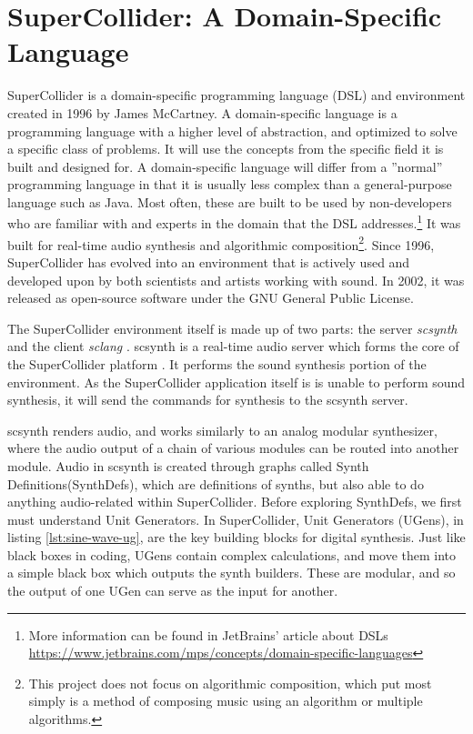 \section[SuperCollider: A Domain-Specific Language]{SuperCollider: A Domain-Specific Language}\label{chapter:supercollider}

SuperCollider is a domain-specific programming language (DSL) and environment created in 1996 by James McCartney. A domain-specific language is a programming language with a higher level of abstraction, and optimized to solve a specific class of problems. It will use the concepts from the specific field it is built and designed for. A domain-specific language will differ from a ''normal'' programming language in that it is usually less complex than a general-purpose language such as Java. Most often, these are built to be used by non-developers who are familiar with and experts in the domain that the DSL addresses.\footnote{More information can be found in JetBrains' article about DSLs  \url{https://www.jetbrains.com/mps/concepts/domain-specific-languages}} It was built for real-time audio synthesis and algorithmic composition\footnote{This project does not focus on algorithmic composition, which put most simply is a method of composing music using an algorithm or multiple algorithms.}. Since 1996, SuperCollider has evolved into an environment that is actively used and developed upon by both scientists and artists working with sound. In 2002, it was released as open-source software under the GNU General Public License.

The SuperCollider environment itself is made up of two parts: the server \textit{scsynth} and the client \textit{sclang} \cite{McCartney_2002}. scsynth is a real-time audio server which forms the core of the SuperCollider platform \cite{McCartney_2021}. It performs the sound synthesis portion of the environment. As the SuperCollider application itself is is unable to perform sound synthesis, it will send the commands for synthesis to the scsynth server. 

scsynth renders audio, and works similarly to an analog modular synthesizer, where the audio output of a chain of various modules can be routed into another module. Audio in scsynth is created through graphs called Synth Definitions(SynthDefs)\cite{McCartney_2002}, which are definitions of synths, but also able to do anything audio-related within SuperCollider. Before exploring SynthDefs, we first must understand Unit Generators. In SuperCollider, Unit Generators (UGens), in listing \ref{lst:sine-wave-ug}, are the key building blocks for digital synthesis. Just like black boxes in coding, UGens contain complex calculations, and move them into a simple black box which outputs the synth builders. These are modular, and so the output of one UGen can serve as the input for another. 

